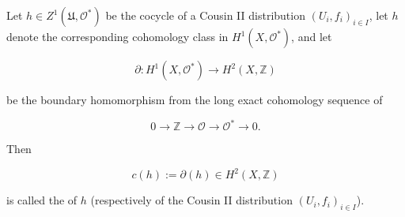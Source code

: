 Let $h \in Z^1(\mathfrak{U}, \mathcal{O}^*)$ be the cocycle of a Cousin II distribution $(U_i, f_i)_{i \in I}$, let $h$ denote the corresponding cohomology class in $H^1(X, \mathcal{O}^*)$, and let

$$\partial: H^1(X, \mathcal{O}^*) \to H^2(X, \mathbb{Z})$$

be the boundary homomorphism from the long exact cohomology sequence of

$$0 \to \mathbb{Z} \to \mathcal{O} \to \mathcal{O}^* \to 0.$$

Then

$$c(h) := \partial(h) \in H^2(X, \mathbb{Z})$$

is called the  of $h$ (respectively of the Cousin II distribution $(U_i, f_i)_{i \in I}$).
